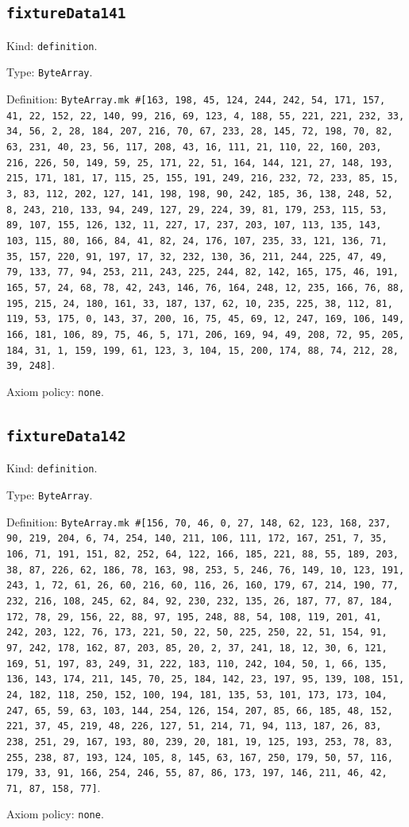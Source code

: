\documentclass[11pt]{article}
\begin{document}
\subsection*{\texttt{fixtureData141}}
\noindent Kind: \texttt{definition}.\par
\noindent Type: \texttt{ByteArray}.\par
\noindent Definition: \texttt{ByteArray.mk \#[163, 198, 45, 124, 244, 242, 54, 171, 157, 41, 22, 152, 22, 140, 99, 216, 69, 123, 4, 188, 55, 221, 221, 232, 33, 34, 56, 2, 28, 184, 207, 216, 70, 67, 233, 28, 145, 72, 198, 70, 82, 63, 231, 40, 23, 56, 117, 208, 43, 16, 111, 21, 110, 22, 160, 203, 216, 226, 50, 149, 59, 25, 171, 22, 51, 164, 144, 121, 27, 148, 193, 215, 171, 181, 17, 115, 25, 155, 191, 249, 216, 232, 72, 233, 85, 15, 3, 83, 112, 202, 127, 141, 198, 198, 90, 242, 185, 36, 138, 248, 52, 8, 243, 210, 133, 94, 249, 127, 29, 224, 39, 81, 179, 253, 115, 53, 89, 107, 155, 126, 132, 11, 227, 17, 237, 203, 107, 113, 135, 143, 103, 115, 80, 166, 84, 41, 82, 24, 176, 107, 235, 33, 121, 136, 71, 35, 157, 220, 91, 197, 17, 32, 232, 130, 36, 211, 244, 225, 47, 49, 79, 133, 77, 94, 253, 211, 243, 225, 244, 82, 142, 165, 175, 46, 191, 165, 57, 24, 68, 78, 42, 243, 146, 76, 164, 248, 12, 235, 166, 76, 88, 195, 215, 24, 180, 161, 33, 187, 137, 62, 10, 235, 225, 38, 112, 81, 119, 53, 175, 0, 143, 37, 200, 16, 75, 45, 69, 12, 247, 169, 106, 149, 166, 181, 106, 89, 75, 46, 5, 171, 206, 169, 94, 49, 208, 72, 95, 205, 184, 31, 1, 159, 199, 61, 123, 3, 104, 15, 200, 174, 88, 74, 212, 28, 39, 248]}.\par
\noindent Axiom policy: \texttt{none}.\par
\subsection*{\texttt{fixtureData142}}
\noindent Kind: \texttt{definition}.\par
\noindent Type: \texttt{ByteArray}.\par
\noindent Definition: \texttt{ByteArray.mk \#[156, 70, 46, 0, 27, 148, 62, 123, 168, 237, 90, 219, 204, 6, 74, 254, 140, 211, 106, 111, 172, 167, 251, 7, 35, 106, 71, 191, 151, 82, 252, 64, 122, 166, 185, 221, 88, 55, 189, 203, 38, 87, 226, 62, 186, 78, 163, 98, 253, 5, 246, 76, 149, 10, 123, 191, 243, 1, 72, 61, 26, 60, 216, 60, 116, 26, 160, 179, 67, 214, 190, 77, 232, 216, 108, 245, 62, 84, 92, 230, 232, 135, 26, 187, 77, 87, 184, 172, 78, 29, 156, 22, 88, 97, 195, 248, 88, 54, 108, 119, 201, 41, 242, 203, 122, 76, 173, 221, 50, 22, 50, 225, 250, 22, 51, 154, 91, 97, 242, 178, 162, 87, 203, 85, 20, 2, 37, 241, 18, 12, 30, 6, 121, 169, 51, 197, 83, 249, 31, 222, 183, 110, 242, 104, 50, 1, 66, 135, 136, 143, 174, 211, 145, 70, 25, 184, 142, 23, 197, 95, 139, 108, 151, 24, 182, 118, 250, 152, 100, 194, 181, 135, 53, 101, 173, 173, 104, 247, 65, 59, 63, 103, 144, 254, 126, 154, 207, 85, 66, 185, 48, 152, 221, 37, 45, 219, 48, 226, 127, 51, 214, 71, 94, 113, 187, 26, 83, 238, 251, 29, 167, 193, 80, 239, 20, 181, 19, 125, 193, 253, 78, 83, 255, 238, 87, 193, 124, 105, 8, 145, 63, 167, 250, 179, 50, 57, 116, 179, 33, 91, 166, 254, 246, 55, 87, 86, 173, 197, 146, 211, 46, 42, 71, 87, 158, 77]}.\par
\noindent Axiom policy: \texttt{none}.\par
\end{document}
